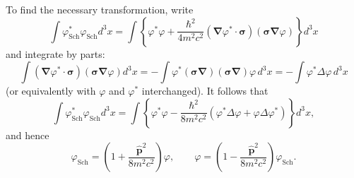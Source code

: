 To find the necessary transformation, write
\[
\int\varphi_{\mathrm{Sch}}^*\varphi_{\mathrm{Sch}}d^3x
=\int\left\{\varphi^*\varphi
+\frac{\hbar^2}{4m^2c^2}(\boldsymbol\nabla\varphi^*\cdot\boldsymbol{\sigma})
(\boldsymbol{\sigma}\boldsymbol\nabla\varphi)\right\}d^3x
\]
and integrate by parts:
\[
\int(\boldsymbol\nabla\varphi^*\cdot\boldsymbol{\sigma})(\boldsymbol{\sigma}\boldsymbol\nabla\varphi)d^3x
=-\int\varphi^*(\boldsymbol{\sigma}\boldsymbol\nabla)(\boldsymbol{\sigma}\boldsymbol\nabla)\varphi\,d^3x
=-\int\varphi^*\Delta\varphi\,d^3x
\]
(or equivalently with $\varphi$ and $\varphi^*$ interchanged). It follows that
\[
\int\varphi_{\mathrm{Sch}}^*\varphi_{\mathrm{Sch}}d^3x
=\int\left\{\varphi^*\varphi
-\frac{\hbar^2}{8m^2c^2}(\varphi^*\Delta\varphi+\varphi\Delta\varphi^*)\right\}d^3x,
\]
and hence
\begin{equation}
\varphi_{\mathrm{Sch}}=\left(1+\frac{\widehat{\mathbf p}^{2}}{8m^2c^2}\right)\varphi,
\qquad
\varphi=\left(1-\frac{\widehat{\mathbf p}^{2}}{8m^2c^2}\right)\varphi_{\mathrm{Sch}}.
\tag{33.11}
\end{equation}

